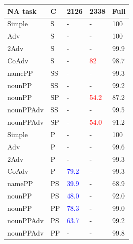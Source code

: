 \begin{center}
\begin{table}[ht]
\centering
\begin{tabular}{|P{2.3cm}|P{0.4cm}||P{0.6cm}|P{0.6cm}|P{0.6cm}|}
\hline
\B NA task & \B C & \B \textbf{\unit{2}{126}} & \B \textbf{\unit{2}{338}} & \B Full \\
\hline


Simple & S & - &  - &  100 \\

Adv & S & - &  - &  100 \\

2Adv & S & - &  - &  99.9 \\

CoAdv & S & - &  \textcolor{red}{82} &  98.7 \\

namePP & SS & - &  - &  99.3 \\

nounPP & SS & - &  - &  99.2 \\

nounPP & SP &  - &  \textcolor{red}{54.2} &  87.2 \\

nounPPAdv & SS &  - &  - & 99.5 \\

nounPPAdv & SP &  - &  \textcolor{red}{54.0} & 91.2 \\


\hline
Simple & P &  - &  - &  100 \\

Adv & P &  - &  - &  99.6 \\

2Adv & P & - &  - &  99.3 \\

CoAdv & P &  \textcolor{blue}{79.2} &  - &  99.3 \\

namePP & PS & \textcolor{blue}{39.9} &  - &  68.9 \\

nounPP & PS &  \textcolor{blue}{48.0} & - &  92.0 \\

nounPP & PP &  \textcolor{blue}{78.3} & - &  99.0 \\

nounPPAdv & PS & \textcolor{blue}{63.7} &  - &  99.2 \\

nounPPAdv & PP & - &  - &  99.8 \\


\end{tabular}
\end{table}
\end{center}

